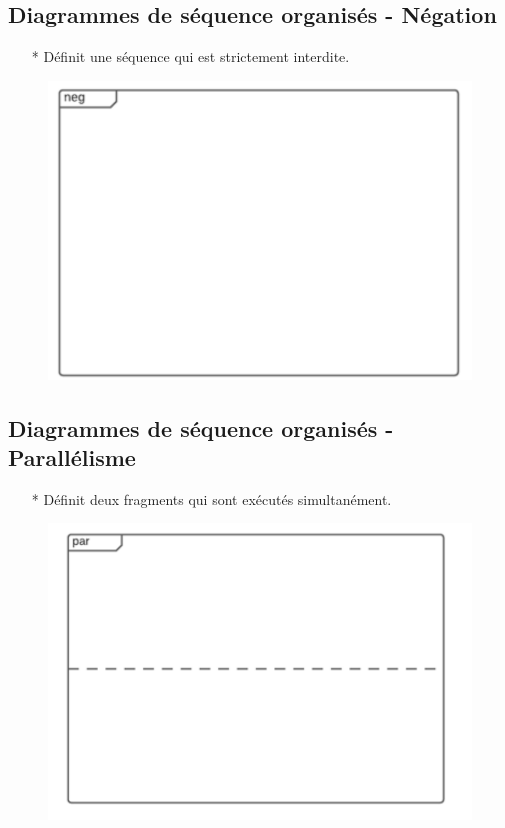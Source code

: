 \documentclass[12pt]{article}
\begin{document}
\subsection{Diagrammes de séquence organisés - Négation}
\begin{itemize}
	\item[*] Définit une séquence qui est strictement interdite.
\end{itemize}
\newpage
\begin{figure}[!hbtp]
	\centering
	\includegraphics[scale=0.75]{Capture8.PNG}
\end{figure}
\subsection{Diagrammes de séquence organisés - Parallélisme}
\begin{itemize}
	\item[*] Définit deux fragments qui sont exécutés simultanément.
\end{itemize}
\begin{figure}[!hbtp]
	\centering
	\includegraphics[scale=0.75]{Capture9.PNG}
\end{figure}
\end{document}

